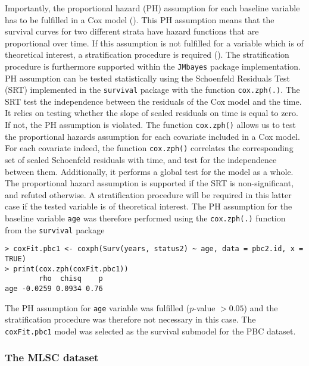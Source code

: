 \documentclass[12pt]{article}
\begin{document}
Importantly, the proportional hazard (PH) assumption for each baseline variable has to be fulfilled in a Cox model (\cite{cox1972}). This PH assumption means that the survival curves for two different strata have hazard functions that are proportional over time. If this assumption is not fulfilled for a variable which is of theoretical interest, a stratification procedure is required (\cite{fox2002cox}). The stratification procedure is furthermore supported within the \texttt{JMbayes} package implementation. PH assumption can be tested statistically using the Schoenfeld Residuals Test (SRT) implemented in the \texttt{survival} package with the function \texttt{cox.zph(.)}. The SRT test the independence between the residuals of the Cox model and the time. It relies on testing whether the slope of scaled residuals on time is equal to zero. If not, the PH assumption is violated. The function \texttt{cox.zph()} allows us to test the proportional hazards assumption for each covariate included in a Cox model. For each covariate indeed, the function \texttt{cox.zph()} correlates the corresponding set of scaled Schoenfeld residuals with time, and test for the independence between them. Additionally, it performs a global test for the model as a whole. The proportional hazard assumption is supported if the SRT is non-significant, and refuted otherwise. A stratification procedure will be required in this latter case if the tested variable is of theoretical interest.
The PH assumption for the baseline variable \texttt{age} was therefore performed using the \texttt{cox.zph(.)} function from the \texttt{survival} package
\begin{verbatim}
> coxFit.pbc1 <- coxph(Surv(years, status2) ~ age, data = pbc2.id, x = TRUE)
> print(cox.zph(coxFit.pbc1))
        rho  chisq    p
age -0.0259 0.0934 0.76
\end{verbatim}
The PH assumption for \texttt{age} variable was fulfilled ($p$-value $>0.05$) and the stratification procedure was therefore not necessary in this case. The \texttt{coxFit.pbc1} model was selected as the survival submodel for the PBC dataset. 

\subsubsection{The MLSC dataset}
\label{survival mlsc}
\end{document}
